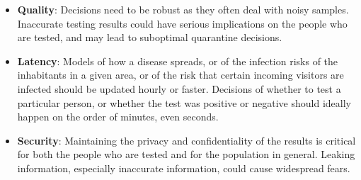 \begin{itemize}[noitemsep,topsep=0pt,parsep=0pt,partopsep=0pt]
\item {\bf Quality}: Decisions need to be robust as they often deal with noisy samples. Inaccurate testing results could have serious implications on the people who are tested, and may lead to suboptimal quarantine decisions.  
\item {\bf Latency}: Models of how a disease spreads, or of the infection risks of the inhabitants in a given area, or of the risk that certain incoming visitors are infected should be updated hourly or faster. Decisions of whether to test a particular person, or whether the test was positive or negative should ideally happen on the order of minutes, even seconds.
\item{\bf Security}: Maintaining the privacy and confidentiality of the results is critical for both the people who are tested and for the population in general. Leaking information, especially inaccurate information, could cause widespread fears.
\end{itemize}
